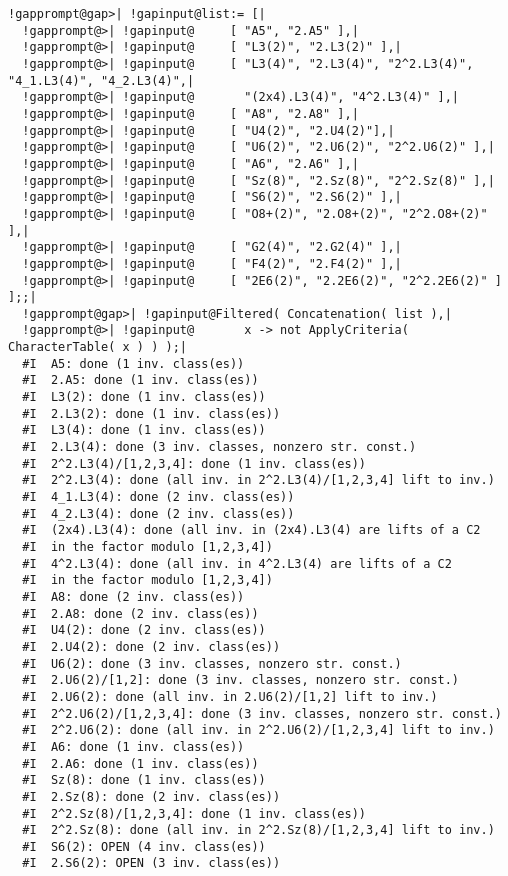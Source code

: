 \documentclass[a4paper,11pt]{report}
\begin{document}
{{{ 
\begin{Verbatim}[commandchars=!@|,fontsize=\small,frame=single,label=Example]
  !gapprompt@gap>| !gapinput@list:= [|
  !gapprompt@>| !gapinput@     [ "A5", "2.A5" ],|
  !gapprompt@>| !gapinput@     [ "L3(2)", "2.L3(2)" ],|
  !gapprompt@>| !gapinput@     [ "L3(4)", "2.L3(4)", "2^2.L3(4)", "4_1.L3(4)", "4_2.L3(4)",|
  !gapprompt@>| !gapinput@       "(2x4).L3(4)", "4^2.L3(4)" ],|
  !gapprompt@>| !gapinput@     [ "A8", "2.A8" ],|
  !gapprompt@>| !gapinput@     [ "U4(2)", "2.U4(2)"],|
  !gapprompt@>| !gapinput@     [ "U6(2)", "2.U6(2)", "2^2.U6(2)" ],|
  !gapprompt@>| !gapinput@     [ "A6", "2.A6" ],|
  !gapprompt@>| !gapinput@     [ "Sz(8)", "2.Sz(8)", "2^2.Sz(8)" ],|
  !gapprompt@>| !gapinput@     [ "S6(2)", "2.S6(2)" ],|
  !gapprompt@>| !gapinput@     [ "O8+(2)", "2.O8+(2)", "2^2.O8+(2)" ],|
  !gapprompt@>| !gapinput@     [ "G2(4)", "2.G2(4)" ],|
  !gapprompt@>| !gapinput@     [ "F4(2)", "2.F4(2)" ],|
  !gapprompt@>| !gapinput@     [ "2E6(2)", "2.2E6(2)", "2^2.2E6(2)" ] ];;|
  !gapprompt@gap>| !gapinput@Filtered( Concatenation( list ),|
  !gapprompt@>| !gapinput@       x -> not ApplyCriteria( CharacterTable( x ) ) );|
  #I  A5: done (1 inv. class(es))
  #I  2.A5: done (1 inv. class(es))
  #I  L3(2): done (1 inv. class(es))
  #I  2.L3(2): done (1 inv. class(es))
  #I  L3(4): done (1 inv. class(es))
  #I  2.L3(4): done (3 inv. classes, nonzero str. const.)
  #I  2^2.L3(4)/[1,2,3,4]: done (1 inv. class(es))
  #I  2^2.L3(4): done (all inv. in 2^2.L3(4)/[1,2,3,4] lift to inv.)
  #I  4_1.L3(4): done (2 inv. class(es))
  #I  4_2.L3(4): done (2 inv. class(es))
  #I  (2x4).L3(4): done (all inv. in (2x4).L3(4) are lifts of a C2
  #I  in the factor modulo [1,2,3,4])
  #I  4^2.L3(4): done (all inv. in 4^2.L3(4) are lifts of a C2
  #I  in the factor modulo [1,2,3,4])
  #I  A8: done (2 inv. class(es))
  #I  2.A8: done (2 inv. class(es))
  #I  U4(2): done (2 inv. class(es))
  #I  2.U4(2): done (2 inv. class(es))
  #I  U6(2): done (3 inv. classes, nonzero str. const.)
  #I  2.U6(2)/[1,2]: done (3 inv. classes, nonzero str. const.)
  #I  2.U6(2): done (all inv. in 2.U6(2)/[1,2] lift to inv.)
  #I  2^2.U6(2)/[1,2,3,4]: done (3 inv. classes, nonzero str. const.)
  #I  2^2.U6(2): done (all inv. in 2^2.U6(2)/[1,2,3,4] lift to inv.)
  #I  A6: done (1 inv. class(es))
  #I  2.A6: done (1 inv. class(es))
  #I  Sz(8): done (1 inv. class(es))
  #I  2.Sz(8): done (2 inv. class(es))
  #I  2^2.Sz(8)/[1,2,3,4]: done (1 inv. class(es))
  #I  2^2.Sz(8): done (all inv. in 2^2.Sz(8)/[1,2,3,4] lift to inv.)
  #I  S6(2): OPEN (4 inv. class(es))
  #I  2.S6(2): OPEN (3 inv. class(es))

\end{Verbatim}}}}
\end{document}
